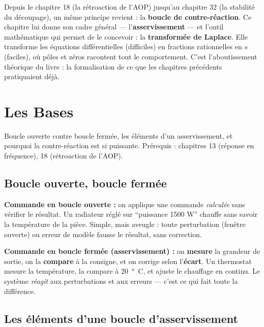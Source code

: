 \documentclass[12pt,a4paper,twoside]{book}
\begin{document}
\vspace{0.5cm}

Depuis le chapitre 18 (la rétroaction de l'AOP) jusqu'au chapitre 32 (la stabilité du découpage), un même principe revient : la \textbf{boucle de contre-réaction}. Ce chapitre lui donne son cadre général --- l'\textbf{asservissement} --- et l'outil mathématique qui permet de le concevoir : la \textbf{transformée de Laplace}. Elle transforme les équations différentielles (difficiles) en fractions rationnelles en $s$ (faciles), où pôles et zéros racontent tout le comportement. C'est l'aboutissement théorique du livre : la formalisation de ce que les chapitres précédents pratiquaient déjà.

\section{Les Bases}

\begin{bases}
Boucle ouverte contre boucle fermée, les éléments d'un asservissement, et pourquoi la contre-réaction est si puissante. Prérequis : chapitres 13 (réponse en fréquence), 18 (rétroaction de l'AOP).
\end{bases}

\subsection{Boucle ouverte, boucle fermée}

\begin{formule}
\textbf{Commande en boucle ouverte :} on applique une commande \textit{calculée} sans vérifier le résultat. Un radiateur réglé sur ``puissance 1500 W'' chauffe sans savoir la température de la pièce. Simple, mais aveugle : toute perturbation (fenêtre ouverte) ou erreur de modèle fausse le résultat, sans correction.

\textbf{Commande en boucle fermée (asservissement) :} on \textbf{mesure} la grandeur de sortie, on la \textbf{compare} à la consigne, et on corrige selon l'\textbf{écart}. Un thermostat mesure la température, la compare à \SI{20}{°C}, et ajuste le chauffage en continu. Le système \textit{réagit} aux perturbations et aux erreurs --- c'est ce qui fait toute la différence.
\end{formule}

\subsection{Les éléments d'une boucle d'asservissement}
\end{document}
